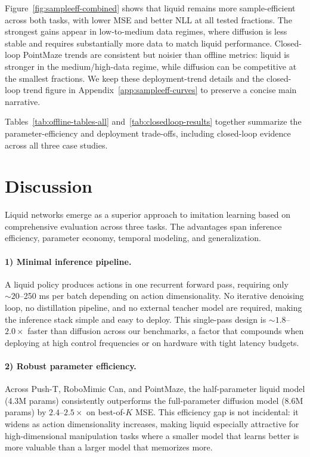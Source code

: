 \documentclass{article}
\begin{document}
Figure~\ref{fig:sampleeff-combined} shows that liquid remains more sample-efficient across both tasks, with lower MSE and better NLL at all tested fractions. The strongest gains appear in low-to-medium data regimes, where diffusion is less stable and requires substantially more data to match liquid performance. Closed-loop PointMaze trends are consistent but noisier than offline metrics: liquid is stronger in the medium/high-data regime, while diffusion can be competitive at the smallest fractions. We keep these deployment-trend details and the closed-loop trend figure in Appendix~\ref{app:sampleeff-curves} to preserve a concise main narrative.

Tables~\ref{tab:offline-tables-all} and~\ref{tab:closedloop-results} together summarize the parameter-efficiency and deployment trade-offs, including closed-loop evidence across all three case studies.

\section{Discussion}

Liquid networks emerge as a superior approach to imitation learning based on comprehensive evaluation across three tasks. The advantages span inference efficiency, parameter economy, temporal modeling, and generalization.

\paragraph{1) Minimal inference pipeline.}
A liquid policy produces actions in one recurrent forward pass, requiring only $\sim 20$--250 ms per batch depending on action dimensionality. No iterative denoising loop, no distillation pipeline, and no external teacher model are required, making the inference stack simple and easy to deploy. This single-pass design is $\sim 1.8$--$2.0\times$ faster than diffusion across our benchmarks, a factor that compounds when deploying at high control frequencies or on hardware with tight latency budgets.

\paragraph{2) Robust parameter efficiency.}
Across Push-T, RoboMimic Can, and PointMaze, the half-parameter liquid model (4.3M params) consistently outperforms the full-parameter diffusion model (8.6M params) by $2.4$--$2.5\times$ on best-of-$K$ MSE. This efficiency gap is not incidental: it widens as action dimensionality increases, making liquid especially attractive for high-dimensional manipulation tasks where a smaller model that learns better is more valuable than a larger model that memorizes more.
\end{document}
